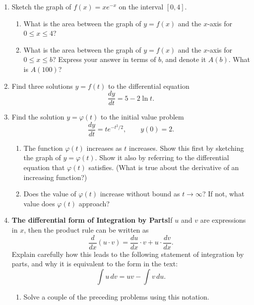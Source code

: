 \begin{enumerate}
  \begin{enumerate}
  \item What is the average value of $\ln{x}$ on $[1, b]$?  Express this
in terms of $b$.  Discuss the following claim: The average value of
$\ln{x}$ on $[1, b]$ is approximately $\ln(b) - 1$ when $b$ is large.


\end{enumerate}
\item Sketch the graph of $f(x) = x e^{-x}$ on the interval $[0, 4]$.

  \begin{enumerate}
  \item What is the area between the graph of $y = f(x)$ and the $x$-axis
for $0 \leq x \leq 4$?

  \item What is the area between the graph of $y = f(x)$ and the $x$-axis
for $0 \leq x \leq b$?  Express your answer in terms of $b$, and
denote it $A(b)$.  What is $A(100)$?


\end{enumerate}
\item Find three solutions $y = f(t)$ to the differential equation
	\[
\dfrac{dy}{dt} = 5 - 2 \ln{t}.
\]


\item Find the solution $y = \varphi(t)$ to the initial value problem
	\[
\dfrac{dy}{dt} = t e^{-t^2/2},
		\qquad y(0) = 2.
\]


  \begin{enumerate}
  \item The function $\varphi(t)$ increases as $t$ increases.  Show this
first by sketching the graph of $y = \varphi(t)$.  Show it also by
referring to the differential equation that $\varphi(t)$ satisfies.
(What is true about the derivative of an increasing function?)


  \item Does the value of $\varphi(t)$ increase without bound as $t \to
\infty$?  If not, what value does $\varphi(t)$ approach?


\end{enumerate}
\item {\bf The differential form of Integration by Parts}\quad If $u$
and $v$ are expressions in $x$, then the product rule can be written
as
\[
\dfrac{d}{dx}(u\cdot v) = \dfrac{du}{dx}\cdot v + u \cdot \dfrac{dv}{dx}.
\]
Explain carefully how this leads to the following statement of integration by parts, and why it is equivalent to the form in the text:
\[
\int u\,dv = uv-\int v\,du.
\]


  \begin{enumerate}
  \item Solve a couple of the preceding problems using this notation.


\end{enumerate}
\end{enumerate}
